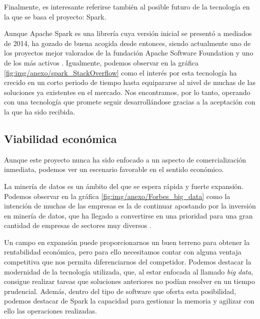 Finalmente, es interesante referirse también al posible futuro de la tecnología en la que se basa el proyecto: Spark.

Aunque Apache Spark es una librería cuya versión inicial se presentó a mediados de 2014, ha gozado de buena acogida desde entonces, siendo actualmente uno de los proyectos mejor valorados de la fundación Apache Software Foundation y uno de los más activos \cite{ApacheContributions}. Igualmente, podemos observar en la gráfica \ref{fig:img/anexo/spark_StackOverflow} como el interés por esta tecnología ha crecido en un corto periodo de tiempo hasta equipararse al nivel de muchas de las soluciones ya existentes en el mercado. Nos encontramos, por lo tanto, operando con una tecnología que promete seguir desarrollándose gracias a la aceptación con la que ha sido recibida.



\subsection{Viabilidad económica}

Aunque este proyecto nunca ha sido enfocado a un aspecto de comercialización inmediata, podemos ver un escenario favorable en el sentido económico.

La minería de datos es un ámbito del que se espera rápida y fuerte expansión. Podemos observar en la gráfica \ref{fig:img/anexo/Forbes_big_data} como la intención de muchas de las empresas es la de continuar apostando por la inversión en minería de datos, que ha llegado a convertirse en una prioridad para una gran cantidad de empresas de sectores muy diversos \cite{forbesBigData}.


Un campo en expansión puede proporcionarnos un buen terreno para obtener la rentabilidad económica, pero para ello necesitamos contar con alguna ventaja competitiva que nos permita diferenciarnos del competidor. Podemos destacar la modernidad de la tecnología utilizada, que, al estar enfocada al llamado \textit{big data}, consigue realizar tareas que soluciones anteriores no podían resolver en un tiempo prudencial. Además, dentro del tipo de software que oferta esta posibilidad, podemos destacar de Spark la capacidad para gestionar la memoria y agilizar con ello las operaciones realizadas.

